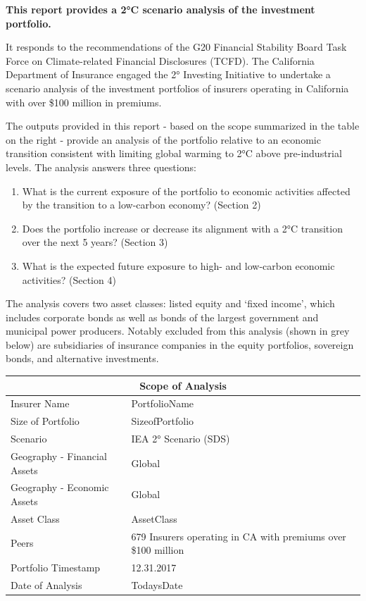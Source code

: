 \documentclass[10pt,table,a4]{article}\usepackage[]{graphicx}\usepackage[]{color}
\begin{document}
	\begin{multicols}{2}
		\textbf{This report provides a 2°C scenario analysis of the investment portfolio.} 
		
		It responds to the recommendations of the G20 Financial Stability Board Task Force on Climate-related Financial Disclosures (TCFD). The California Department of Insurance engaged the 2° Investing Initiative to undertake a scenario analysis of the investment portfolios of insurers operating in California with over \$100 million in premiums.
		
		The outputs provided in this report - based on the scope summarized in the table on the right - provide an analysis of the portfolio relative to an economic transition consistent with limiting global warming to 	2°C above pre-industrial levels. The analysis answers three questions: 
		
		\begin{enumerate}
			\item{What is the current exposure of the portfolio to economic activities affected by the transition to a low-carbon economy? (Section 2)}
			\item{Does the portfolio increase or decrease its alignment with a 2°C transition over the next 5 years? (Section 3)}
			\item{What is the expected future exposure to high- and low-carbon economic activities? (Section 4)}
		\end{enumerate}
		
		The analysis covers two asset classes: listed equity and `fixed income', which includes corporate bonds as well as bonds of the largest government and municipal power producers. Notably excluded from this analysis (shown in grey below) are subsidiaries of insurance companies in the equity portfolios, sovereign bonds, and alternative investments. 

		
		\begin{center}
			{
				\setlength{\tabcolsep}{10pt} %
				\renewcommand{\arraystretch}{1.5} %
				\begin{tabular}{ p{.35\linewidth} p{.49\linewidth} }
					\hline
					\multicolumn{2}{c}{\textbf{Scope of Analysis}} \\
					\hline
					Insurer Name & PortfolioName \\ 
					Size of Portfolio & SizeofPortfolio \\ 
					Scenario & IEA 2° Scenario (SDS) \\ 
					Geography - \newline Financial Assets & Global \\ 
					Geography - \newline Economic Assets & Global \\ 
					Asset Class & AssetClass \\ 
					Peers & 679 Insurers operating in CA with premiums over \$100 million \\
					Portfolio Timestamp & 12.31.2017 \\ 
					Date of Analysis & TodaysDate \\ 
					\hline
				\end{tabular}
			}
			

\end{center}
\end{multicols}
\end{document}
